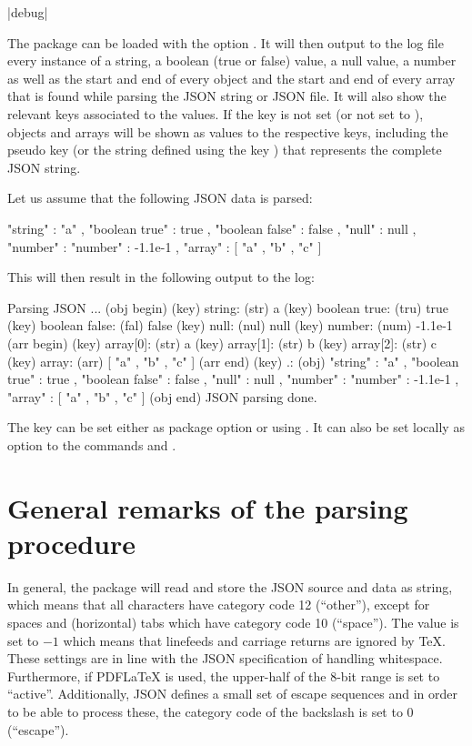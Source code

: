 \documentclass[a4paper]{article}
\begin{document}
\begin{macrodef}
|debug|
\end{macrodef}
The package can be loaded with the option . It will then output to the log file every instance of a string, a boolean (true or false) value, a null value, a number as well as the start and end of every object and the start and end of every array that is found while parsing the JSON string or JSON file. It will also show the relevant keys associated to the values. If the key  is not set (or not set to ), objects and arrays will be shown as values to the respective keys, including the pseudo key  (or the string defined using the key ) that represents the complete JSON string.

Let us assume that the following JSON data is parsed:

\begin{codeexample}
{
  "string" : "a" ,
  "boolean true" : true ,
  "boolean false" : false ,
  "null" : null ,
  "number" : "number" : -1.1e-1 ,
  "array" : [ "a" , "b" , "c" ]
}
\end{codeexample}

This will then result in the following output to the log:

\begin{codeexample}
Parsing JSON ...
(obj begin)
(key) string:
  (str) a
(key) boolean true:
  (tru) true
(key) boolean false:
  (fal) false
(key) null:
  (nul) null
(key) number:
  (num) -1.1e-1
(arr begin)
(key) array[0]:
  (str) a
(key) array[1]:
  (str) b
(key) array[2]:
  (str) c
(key) array:
  (arr) [ "a" , "b" , "c" ]
(arr end)
(key) .:
  (obj) { "string" : "a" , "boolean true" : true , "boolean false" :
  false , "null" : null , "number" : "number" : -1.1e-1 , "array" :
  [ "a" , "b" , "c" ] }
(obj end)
JSON parsing done.
\end{codeexample}

The  key can be set either as package option or using \macro{\JSONParseSet}. It can also be set locally as option to the commands \macro{\JSONParse} and \macro{\JSONParseFromFile}.

\section{General remarks of the parsing procedure}\label{sec:general}

In general, the package will read and store the JSON source and data as string, which means that all characters have category code 12 (``other''), except for spaces and (horizontal) tabs which have category code 10 (``space''). The \macro{\endlinechar} value is set to $-1$ which means that linefeeds and carriage returns are ignored by TeX. These settings are in line with the JSON specification of handling whitespace. Furthermore, if PDFLaTeX is used, the upper-half of the 8-bit range is set to ``active''. Additionally, JSON defines a small set of escape sequences and in order to be able to process these, the category code of the backslash is set to 0 (``escape'').
\end{document}
